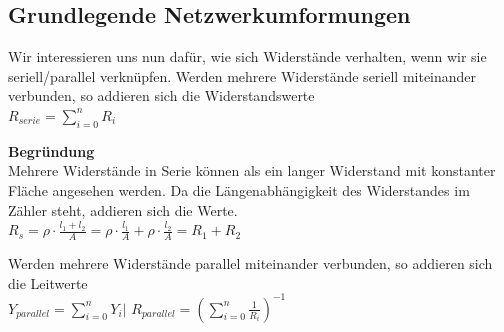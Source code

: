 					\newpage

										\subsection{Grundlegende Netzwerkumformungen}
										Wir interessieren uns nun dafür, wie sich Widerstände verhalten, wenn wir sie seriell/parallel verknüpfen.
										\beginip
										Werden mehrere Widerstände seriell miteinander verbunden, so addieren sich die Widerstandswerte \\
										\formulaBegin
										$\displaystyle R_{serie} = \sum_{i=0}^n R_i $
										\formulaEnd
										\iend

							        \vspace{1em}

										\textbf{Begründung} \\
										Mehrere Widerstände in Serie können als ein langer Widerstand mit konstanter Fläche angesehen werden. Da die Längenabhängigkeit des Widerstandes im Zähler steht, addieren sich die Werte. \\
										$\displaystyle R_s = \rho \cdot \frac{l_1+l_2}{A} = \rho \cdot \frac{l_1}{A}  + \rho \cdot \frac{l_2}{A}  = R_1 + R_2 $
										\fix
										\begin{center}
										\end{center}
					\fix



										\beginip
										Werden mehrere Widerstände parallel miteinander verbunden, so addieren sich die Leitwerte \\
										\formulaBegin
										$\displaystyle Y_{parallel} = \sum_{i=0}^n Y_i \Bigg\rvert$
										$\displaystyle R_{parallel} = \left(\sum_{i=0}^n \frac{1}{R_i}\right)^{-1}$
										\formulaEnd
										\iend

